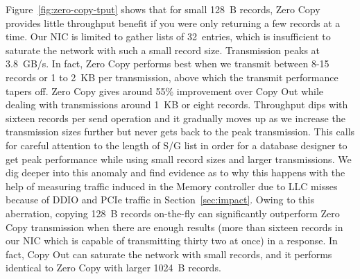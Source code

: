 
Figure~\ref{fig:zero-copy-tput} shows that for small 128~B records, Zero Copy
provides little throughput benefit if you were only returning a few records 
at a time. Our NIC is limited to gather lists
of 32~entries, which is insufficient to saturate the network with such a small
record size. Transmission peaks at 3.8~GB/s. In fact, Zero Copy performs best when
we transmit between 8-15 records or 1 to 2~KB per transmission, above which the transmit performance 
tapers off. Zero Copy gives around 55\% improvement over Copy Out while dealing 
with transmissions around 1~KB or eight records. Throughput dips with sixteen records per send operation and it gradually moves up as we 
increase the transmission sizes further but never gets back to the peak transmission. This calls 
for careful attention to the length of S/G list in order for a database designer to get peak performance while using small record sizes and larger 
transmissions. We dig deeper into this anomaly and find evidence as to why this happens with the 
help of measuring traffic induced in the Memory controller due to LLC misses because of DDIO and 
PCIe traffic in Section~\ref{sec:impact}. Owing to this aberration, copying 128~B records 
on-the-fly can significantly outperform Zero Copy transmission when there are 
enough results (more than sixteen records in our NIC which is capable of transmitting thirty two at once) 
in a response. In fact, Copy Out can saturate the network with small records, and it
performs identical to Zero Copy with larger 1024~B records.
\newline


